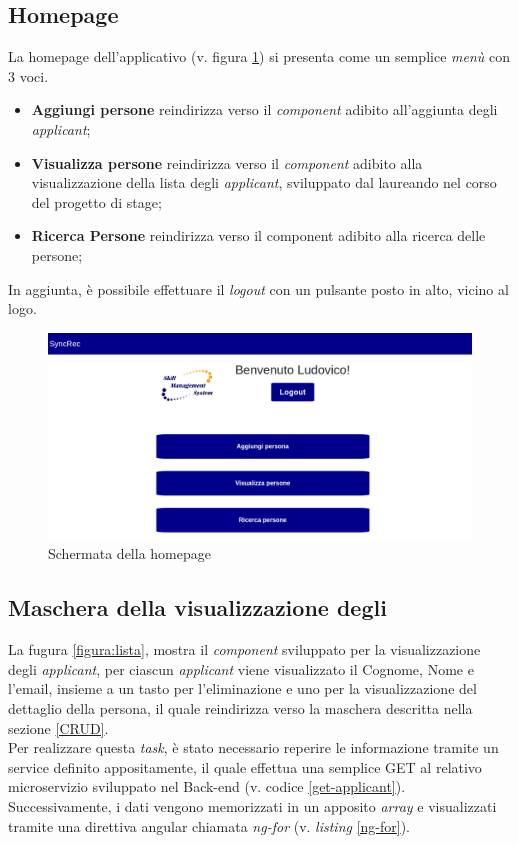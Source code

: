 \subsection{Homepage}
La homepage dell'applicativo (v. figura \ref{figura:homepage}) si presenta come un semplice \textit{menù} con 3 voci.
\begin{itemize}
	\item \textbf{Aggiungi persone} reindirizza verso il \textit{component} adibito all'aggiunta degli \textit{applicant};
	\item \textbf{Visualizza persone} reindirizza verso il \textit{component} adibito alla visualizzazione della lista degli \textit{applicant}, sviluppato dal laureando nel corso del progetto di stage;
	\item \textbf{Ricerca Persone} reindirizza verso il component adibito alla ricerca delle persone;
\end{itemize}
In aggiunta, è possibile effettuare il \textit{logout} con un pulsante posto in alto, vicino al logo.
\vspace{0.5em}
\begin{figure}[!h] 
	\centering 
	\includegraphics[width=1\columnwidth]{immagini/svil/homepage} 
	\caption{Schermata della homepage}
	\label{figura:homepage}
\end{figure}

\subsection{Maschera della visualizzazione degli\applicant} \label{section: applicant-list}
La fugura \ref{figura:lista}, mostra il \textit{component} sviluppato per la visualizzazione degli \textit{applicant}, per ciascun \textit{applicant} viene visualizzato il Cognome, Nome e l'email, insieme a un tasto per l'eliminazione e uno per la visualizzazione del dettaglio della persona, il quale reindirizza verso la maschera descritta nella sezione \ref{CRUD}.\\
Per realizzare questa \textit{task}, è stato necessario reperire le informazione tramite un service definito appositamente, il quale effettua una semplice GET al relativo microservizio sviluppato nel Back-end (v. codice \ref{get-applicant}).
Successivamente, i dati vengono memorizzati in un apposito \textit{array} e visualizzati tramite una direttiva angular chiamata \textit{ng-for} (v. \textit{listing}  \ref{ng-for}).

